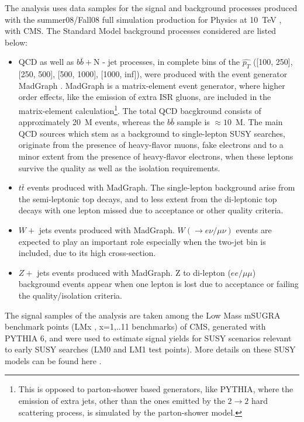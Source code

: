 The analysis uses data samples for the signal and background processes produced with the summer08/Fall08 full simulation production for Physics at 10~TeV \cite{data}, with CMS. The Standard Model background processes considered are listed below:
\begin{itemize}
\item QCD as well as $b\bar{b} + \textrm{N - jet}$ processes, in complete bins of the $\hat{p_{T}}$ ([100, 250], [250, 500], [500, 1000], [1000, inf]), were produced with the event generator MadGraph \cite{mad}. MadGraph is a matrix-element event generator, where higher order effects, like the emission of extra ISR gluons, are included in the matrix-element calculation\footnote{This is opposed to parton-shower based generators, like PYTHIA, where the emission of extra jets, other than the ones emitted by the $2 \rightarrow 2$ hard scattering process, is simulated by the parton-shower model.}. The total QCD bacgkround consists of approximately 20~M events, whereas the $b\bar{b}$ sample is $\approx 10$~M. The main QCD sources which stem as a background to single-lepton SUSY searches, originate from the presence of heavy-flavor muons, fake electrons and to a minor extent from the presence of heavy-flavor electrons, when these leptons survive the quality as well as the isolation requirements.
\item $t \bar{t}$ events produced with MadGraph. The single-lepton background arise from the semi-leptonic top decays, and to less extent from the di-leptonic top decays with one lepton missed due to acceptance or other quality criteria.
\item $W + $ jets events produced with MadGraph. $W (\rightarrow e \nu / \mu \nu)$ events are expected to play an important role especially when the two-jet bin is included, due to its high cross-section.
\item $Z + $ jets events produced with MadGraph. Z to di-lepton ($ee / \mu\mu$) background events appear when one lepton is lost due to acceptance or failing the quality/isolation criteria.
\end{itemize}

The signal samples of the analysis are taken among the Low Mass mSUGRA benchmark points (LMx , x=1,..11 benchmarks) of CMS, generated with PYTHIA 6, and were used to estimate signal yields for SUSY scenarios relevant to early SUSY searches (LM0 and LM1 test points). More details on these SUSY models can be found here \cite{lmx}. \\

